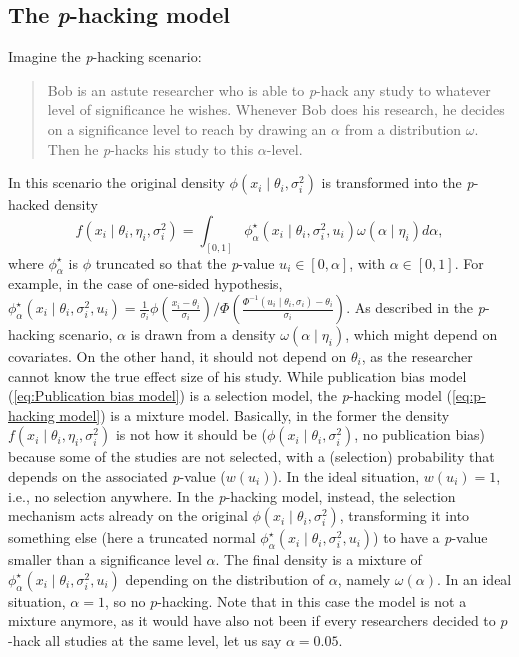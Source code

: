 \documentclass[useAMS,usenatbib,referee]{biom}
\begin{document}
\subsection{The \textit{p}-hacking model}\label{subsect:p-hacking}
Imagine the \textit{p}-hacking scenario:
\begin{quote}
Bob is an astute researcher who is able to \textit{p}-hack any study to whatever level of significance he wishes. Whenever Bob does his research, he decides on a significance level to reach by drawing an $\alpha$ from a distribution $\omega$. Then he \textit{p}-hacks his study to this $\alpha$-level.
\end{quote}
In this scenario the original density $\phi(x_{i}\mid\theta_{i},\sigma^2_{i})$
is transformed into the \textit{p}-hacked density
\begin{equation}\label{eq:p-hacking model}
f(x_{i}\mid\theta_{i},\eta_{i}, \sigma^2_i)=\int_{[0,1]}\phi_\alpha^{\star}(x_{i}\mid\theta_{i},\sigma^2_{i}, u_i)\omega(\alpha\mid \eta_i)d\alpha,
\end{equation}
where $\phi_\alpha^{\star}$ is $\phi$ truncated so that the \textit{p}-value $u_i\in\left[0,\alpha\right]$, with $\alpha \in [0,1]$. For example, in the case of one-sided hypothesis, $\phi_\alpha^{\star}(x_{i}\mid\theta_{i},\sigma^2_{i}, u_i) = \frac{1}{\sigma_i}\phi(\frac{x_i - \theta_i}{\sigma_i})/\Phi(\frac{\Phi^{-1}(u_i\mid\theta_i,\sigma_i)-\theta_i}{\sigma_i})$. As described in the \textit{p}-hacking scenario, $\alpha$ is drawn from a density $\omega(\alpha \mid \eta_i)$, which might depend on covariates. On the other hand, it should not depend on $\theta_{i}$, as the researcher cannot know the true effect size of his study. While publication bias model (\ref{eq:Publication bias model}) is a selection model, the \textit{p}-hacking model (\ref{eq:p-hacking model}) is a mixture model. Basically, in the former the density $f(x_{i}\mid\theta_{i},\eta_{i}, \sigma^2_i)$ is not how it should be ($\phi(x_{i}\mid\theta_{i},\sigma^2_{i})$, no publication bias) because some of the studies are not selected, with a (selection) probability that depends on the associated \textit{p}-value ($w(u_i)$). In the ideal situation, $w(u_i) = 1$, i.e., no selection anywhere. In the \textit{p}-hacking model, instead, the selection mechanism acts already on the original $\phi(x_{i}\mid\theta_{i},\sigma^2_{i})$, transforming it into something else (here a truncated normal $\phi_\alpha^{\star}(x_{i}\mid\theta_{i},\sigma^2_{i}, u_i)$) to have a \textit{p}-value smaller than a significance level $\alpha$. The final density is a mixture of $\phi_\alpha^{\star}(x_{i}\mid\theta_{i},\sigma^2_{i}, u_i)$ depending on the distribution of $\alpha$, namely $\omega(\alpha)$. In an ideal situation, $\alpha = 1$, so no $p$-hacking. Note that in this case the model is not a mixture anymore, as it would have also not been if every researchers decided to $p$-hack all studies at the same level, let us say $\alpha = 0.05$. 
\end{document}
